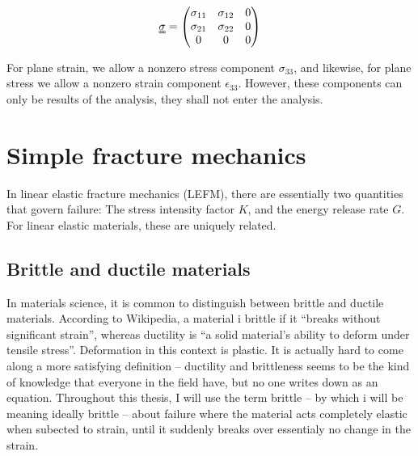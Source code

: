 \begin{equation}
\uuline \sigma = 
\begin{pmatrix}
	\sigma_{11} & \sigma_{12} & 0 \\
	\sigma_{21} & \sigma_{22} & 0 \\
	0 & 0 & 0
\end{pmatrix}
\label{eq:plane_stress}
\end{equation}

For plane strain, we allow a nonzero stress component $\sigma_{33}$, and likewise, for plane stress we allow a nonzero strain component $\epsilon_{33}$. However, these components can only be results of the analysis, they shall not enter the analysis. 


\section{Simple fracture mechanics}
In linear elastic fracture mechanics (LEFM), there are essentially two quantities that govern failure: The stress intensity factor $K$, and the energy release rate $G$. For linear elastic materials, these are uniquely related.

\subsection{Brittle and ductile materials}
In materials science, it is common to distinguish between brittle and ductile materials. According to Wikipedia, a material i brittle if it ``breaks without significant strain'', whereas ductility is ``a solid material's ability to deform under tensile stress''. Deformation in this context is plastic. It is actually hard to come along a more satisfying definition -- ductility and brittleness seems to be the kind of knowledge that everyone in the field have, but no one writes down as an equation. Throughout this thesis, I will use the term brittle -- by which i will be meaning ideally brittle -- about failure where the material acts completely elastic when subected to strain, until it suddenly breaks over essentialy no change in the strain.

